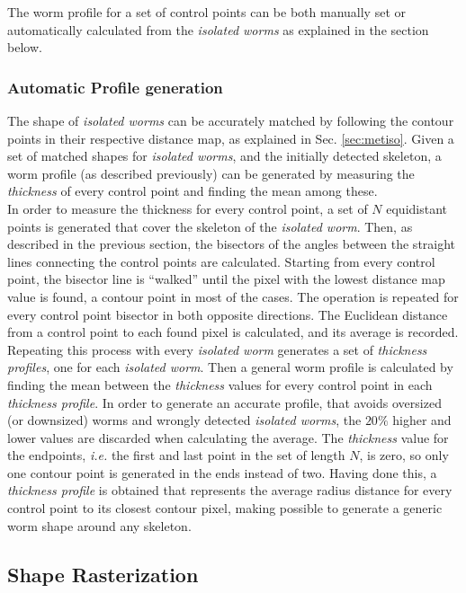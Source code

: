 The worm profile for a set of control points can be both manually set or automatically
calculated from the \emph{isolated worms} as explained in the section below.

\subsubsection{Automatic Profile generation}
\label{sec:metwormprof}

The shape of \emph{isolated worms}  can be accurately matched
by following the contour points in their respective distance map, as explained 
in Sec. \ref{sec:metiso}. Given a set of matched shapes for \emph{isolated worms}, and
the initially detected skeleton, a worm profile (as described previously) can be 
generated by measuring the \emph{thickness} of every control point and finding the mean
among these.\\

In order to measure the thickness for every control point, a set of
$N$ equidistant points is generated that cover the skeleton of the \emph{isolated worm}.
Then, as described in the previous section, the bisectors of the angles between the 
straight lines connecting the control points are calculated. Starting from every control
point, the bisector line is ``walked'' until the pixel with the lowest distance map
value is found, a contour point in most of the cases. The operation is repeated for every 
control point bisector in both opposite directions. The Euclidean distance from a control
point to each found pixel is calculated, and its average is recorded. Repeating this process
with every \emph{isolated worm} generates a set of \emph{thickness profiles}, one for each
\emph{isolated worm}. Then a general worm profile is calculated by finding the mean between
the \emph{thickness} values for every control point in each \emph{thickness profile}. In order 
to generate an accurate profile, that avoids oversized (or downsized) worms and wrongly
detected \emph{isolated worms}, the $20\%$ higher and lower values are discarded when 
calculating the average. The \emph{thickness} value for
the endpoints, \emph{i.e.} the first and last point in the set of length $N$, is zero,
so only one contour point is generated in the ends instead of two.
Having done this, a \emph{thickness profile} is obtained that represents the average 
radius distance for every control point to its closest contour pixel, making possible
to generate a generic worm shape around any skeleton. 

\subsection{Shape Rasterization}
\label{sec:metrast}

